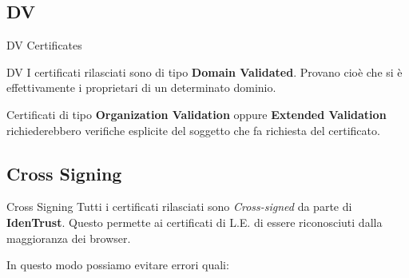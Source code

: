 \documentclass[xcolor=svgnames,11pt]{beamer}
\begin{document}
\subsection{DV}
\begin{frame}{DV Certificates}
\begin{block}{DV}
I certificati rilasciati sono di tipo \textbf{Domain Validated}. Provano cioè
che si è effettivamente i proprietari di un determinato dominio.
\end{block}
\medskip\pause

Certificati di tipo \textbf{Organization Validation} oppure \textbf{Extended Validation}
richiederebbero verifiche esplicite del soggetto che fa richiesta del certificato.

\end{frame}

\subsection{Cross Signing}
\begin{frame}{Cross Signing}
Tutti i certificati rilasciati sono \emph{Cross-signed} da parte di \textbf{IdenTrust}.
Questo permette ai certificati di L.E. di essere riconosciuti dalla maggioranza dei browser.

\medskip\pause

In questo modo possiamo evitare errori quali:

\end{frame}
\end{document}
